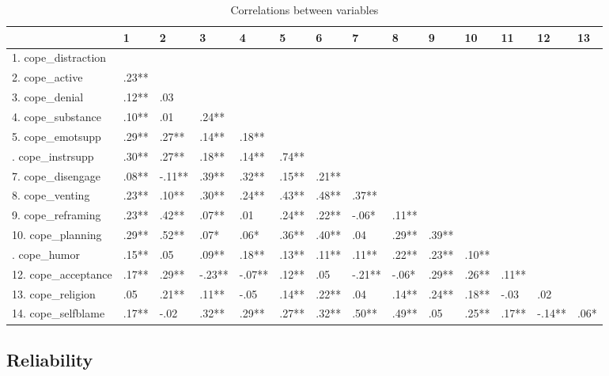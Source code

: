 \documentclass[]{article}
\begin{document}
\begin{table}[H]

\caption{\label{tab:unnamed-chunk-17}Correlations between variables}
\centering
\fontsize{6}{8}\selectfont
\begin{tabular}[t]{llllllllllllll}
\toprule
  & 1 & 2 & 3 & 4 & 5 & 6 & 7 & 8 & 9 & 10 & 11 & 12 & 13\\
\midrule
1. cope\_distraction &  &  &  &  &  &  &  &  &  &  &  &  & \\
2. cope\_active & .23** &  &  &  &  &  &  &  &  &  &  &  & \\
3. cope\_denial & .12** & .03 &  &  &  &  &  &  &  &  &  &  & \\
4. cope\_substance & .10** & .01 & .24** &  &  &  &  &  &  &  &  &  & \\
5. cope\_emotsupp & .29** & .27** & .14** & .18** &  &  &  &  &  &  &  &  & \\
\addlinespace
6. cope\_instrsupp & .30** & .27** & .18** & .14** & .74** &  &  &  &  &  &  &  & \\
7. cope\_disengage & .08** & -.11** & .39** & .32** & .15** & .21** &  &  &  &  &  &  & \\
8. cope\_venting & .23** & .10** & .30** & .24** & .43** & .48** & .37** &  &  &  &  &  & \\
9. cope\_reframing & .23** & .42** & .07** & .01 & .24** & .22** & -.06* & .11** &  &  &  &  & \\
10. cope\_planning & .29** & .52** & .07* & .06* & .36** & .40** & .04 & .29** & .39** &  &  &  & \\
\addlinespace
11. cope\_humor & .15** & .05 & .09** & .18** & .13** & .11** & .11** & .22** & .23** & .10** &  &  & \\
12. cope\_acceptance & .17** & .29** & -.23** & -.07** & .12** & .05 & -.21** & -.06* & .29** & .26** & .11** &  & \\
13. cope\_religion & .05 & .21** & .11** & -.05 & .14** & .22** & .04 & .14** & .24** & .18** & -.03 & .02 & \\
14. cope\_selfblame & .17** & -.02 & .32** & .29** & .27** & .32** & .50** & .49** & .05 & .25** & .17** & -.14** & .06*\\
\bottomrule
\end{tabular}
\end{table}

\hypertarget{reliability-2}{%
\subsection{Reliability}\label{reliability-2}}
\end{document}

